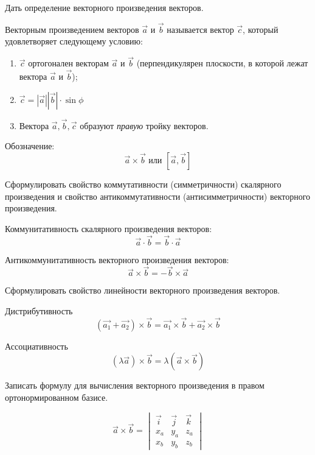 \begin{question}
  Дать определение векторного произведения векторов.
\end{question}
\begin{answer}
  Векторным произведением векторов $\vec{a}$ и $\vec{b}$ называется вектор $\vec{c}$, который удовлетворяет следующему условию:
  \begin{enumerate}
    \item $\vec{c}$ ортогонален векторам $\vec{a}$ и $\vec{b}$ (перпендикулярен плоскости, в которой лежат вектора $\vec{a}$ и $\vec{b}$);
    \item $\vec{c} = |\vec{a}| |\vec{b}| \cdot \sin \phi$
    \item Вектора $\vec{a}, \vec{b}, \vec{c}$ образуют \textit{правую} тройку векторов.
  \end{enumerate}
  Обозначение: \[
    \vec{a} \times \vec{b} \text{ или } [\vec{a}, \vec{b}]
  \]   
\end{answer}

\begin{question}
  Сформулировать свойство коммутативности (симметричности) скалярного произведения и свойство антикоммутативности (антисимметричности) векторного произведения.
\end{question}
\begin{answer}
  Коммунитативность скалярного произведения векторов: \[
    \vec{a} \cdot \vec{b} = \vec{b} \cdot \vec{a}
  \] 

  Антикоммунитативность векторного произведения векторов: \[
    \vec{a} \times \vec{b} = - \vec{b} \times \vec{a}  
  \] 
\end{answer}

\begin{question}
  Сформулировать свойство линейности векторного произведения векторов.
\end{question}
\begin{answer}
  Дистрибутивность \[
    (\vec{a_1} + \vec{a_2}) \times \vec{b} = \vec{a_1} \times \vec{b} + \vec{a_2} \times  \vec{b} 
  \]  

  Ассоциативность \[
    (\lambda \vec{a}) \times \vec{b} = \lambda (\vec{a} \times \vec{b})  
  \]  
\end{answer}

\begin{question}
  Записать формулу для вычисления векторного произведения в правом ортонормированном базисе.
\end{question}
\begin{answer}
  \[
  \vec{a} \times \vec{b} = 
  \begin{vmatrix}
    \vec{i} & \vec{j} & \vec{k} \\
    x_a & y_a & z_a \\
    x_b & y_b & z_b 
  \end{vmatrix}
  \] 
\end{answer}

